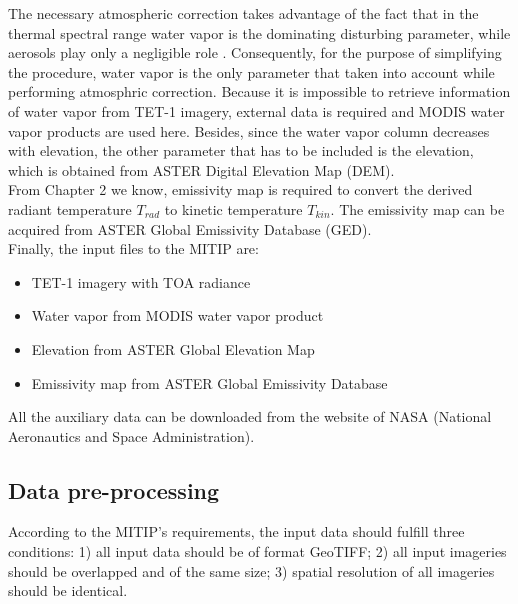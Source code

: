 \noindent The necessary atmospheric correction takes advantage of the fact that in the thermal spectral range water vapor is the dominating disturbing parameter, while aerosols play only a negligible role \parencite{Reference204}. Consequently, for the purpose of simplifying the procedure, water vapor is the only parameter that taken into account while performing atmosphric correction. Because it is impossible to retrieve information of water vapor from TET-1 imagery, external data is required and MODIS water vapor products are used here. Besides, since the water vapor column decreases with elevation, the other parameter that has to be included is the elevation, which is obtained from ASTER Digital Elevation Map (DEM).\\

\noindent From Chapter 2 we know, emissivity map is required to convert the derived radiant temperature $T_{rad}$ to kinetic temperature $T_{kin}$. The emissivity map can be acquired from ASTER Global Emissivity Database (GED).\\

\noindent Finally, the input files to the MITIP are:
\begin{itemize}
\item TET-1 imagery with TOA radiance
\item Water vapor from MODIS water vapor product
\item Elevation from ASTER Global Elevation Map
\item Emissivity map from ASTER Global Emissivity Database
\end{itemize}

\noindent All the auxiliary data can be downloaded from the website of NASA (National Aeronautics and Space Administration).\\


\subsection{Data pre-processing}
According to the MITIP's requirements, the input data should fulfill three conditions: 1) all input data should be of format GeoTIFF; 2) all input imageries should be overlapped and of the same size; 3) spatial resolution of all imageries should be identical.\\


